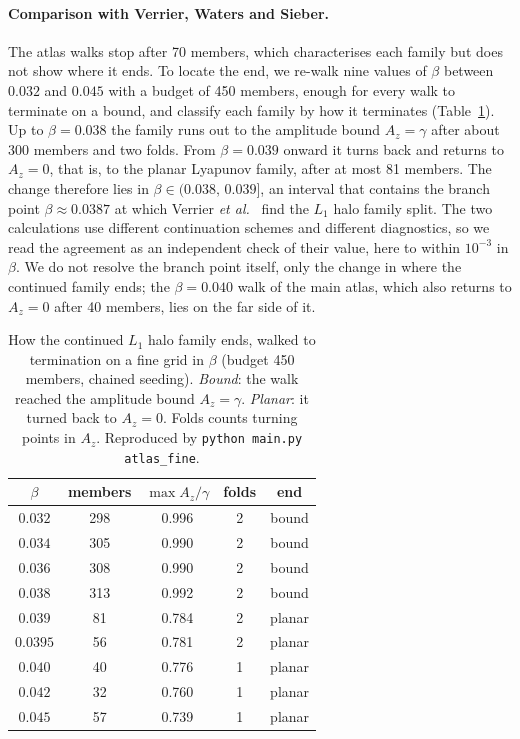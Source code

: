 \documentclass[pdflatex,sn-mathphys-num]{sn-jnl}
\begin{document}
\paragraph{Comparison with Verrier, Waters and Sieber.} The atlas walks stop
after 70 members, which characterises each family but does not show where it
ends. To locate the end, we re-walk nine values of $\beta$ between $0.032$ and
$0.045$ with a budget of 450 members, enough for every walk to terminate on a
bound, and classify each family by how it terminates (Table~\ref{tab:fine}).
Up to $\beta=0.038$ the family runs out to the amplitude bound $A_z=\gamma$
after about 300 members and two folds. From $\beta=0.039$ onward it turns back
and returns to $A_z=0$, that is, to the planar Lyapunov family, after at most
81 members. The change therefore lies in $\beta\in(0.038,\,0.039]$, an interval
that contains the branch point $\beta\approx0.0387$ at which Verrier
\emph{et al.}~\cite{verrier2014} find the $L_1$ halo family split. The two
calculations use different continuation schemes and different diagnostics, so
we read the agreement as an independent check of their value, here to within
$10^{-3}$ in $\beta$. We do not resolve the branch point itself, only the change
in where the continued family ends; the $\beta=0.040$ walk of the main atlas,
which also returns to $A_z=0$ after 40 members, lies on the far side of it.

\begin{table}[t]
  \centering
  \caption{How the continued $L_1$ halo family ends, walked to termination on a
  fine grid in $\beta$ (budget 450 members, chained seeding). \emph{Bound}: the
  walk reached the amplitude bound $A_z=\gamma$. \emph{Planar}: it turned back
  to $A_z=0$. Folds counts turning points in $A_z$. Reproduced by
  \texttt{python main.py atlas\_fine}.}
  \label{tab:fine}
  \begin{tabular}{ccccc}
    \toprule
    $\beta$ & members & $\max A_z/\gamma$ & folds & end \\
    \midrule
    $0.032$  & 298 & 0.996 & 2 & bound \\
    $0.034$  & 305 & 0.990 & 2 & bound \\
    $0.036$  & 308 & 0.990 & 2 & bound \\
    $0.038$  & 313 & 0.992 & 2 & bound \\
    $0.039$  & 81  & 0.784 & 2 & planar \\
    $0.0395$ & 56  & 0.781 & 2 & planar \\
    $0.040$  & 40  & 0.776 & 1 & planar \\
    $0.042$  & 32  & 0.760 & 1 & planar \\
    $0.045$  & 57  & 0.739 & 1 & planar \\
    \bottomrule
  \end{tabular}
\end{table}
\end{document}
